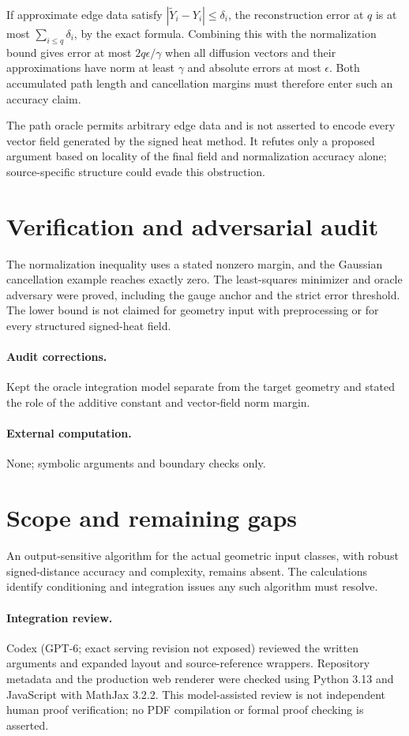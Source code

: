 \documentclass[11pt]{article}
\begin{document}
If approximate edge data satisfy $|\widetilde Y_i-Y_i|\leq\delta_i$, the reconstruction error at $q$ is at most $\sum_{i\leq q}\delta_i$, by the exact formula. Combining this with the normalization bound gives error at most $2q\epsilon/\gamma$ when all diffusion vectors and their approximations have norm at least $\gamma$ and absolute errors at most $\epsilon$. Both accumulated path length and cancellation margins must therefore enter such an accuracy claim.

The path oracle permits arbitrary edge data and is not asserted to encode every vector field generated by the signed heat method. It refutes only a proposed argument based on locality of the final field and normalization accuracy alone; source-specific structure could evade this obstruction.
\section{Verification and adversarial audit}
The normalization inequality uses a stated nonzero margin, and the Gaussian cancellation example reaches exactly zero. The least-squares minimizer and oracle adversary were proved, including the gauge anchor and the strict error threshold. The lower bound is not claimed for geometry input with preprocessing or for every structured signed-heat field.
\paragraph{Audit corrections.} Kept the oracle integration model separate from the target geometry and stated the role of the additive constant and vector-field norm margin.
\paragraph{External computation.} None; symbolic arguments and boundary checks only.
\section{Scope and remaining gaps}
An output-sensitive algorithm for the actual geometric input classes, with robust signed-distance accuracy and complexity, remains absent. The calculations identify conditioning and integration issues any such algorithm must resolve.
\paragraph{Integration review.} Codex (GPT-6; exact serving revision not exposed) reviewed the written arguments and expanded layout and source-reference wrappers. Repository metadata and the production web renderer were checked using Python 3.13 and JavaScript with MathJax 3.2.2. This model-assisted review is not independent human proof verification; no PDF compilation or formal proof checking is asserted.
\end{document}
